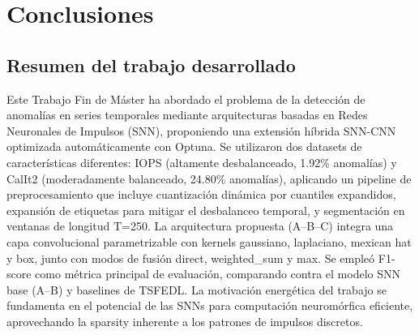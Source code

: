 \chapter{Conclusiones}

\section{Resumen del trabajo desarrollado}
Este Trabajo Fin de Máster ha abordado el problema de la detección de anomalías en series temporales mediante arquitecturas basadas en Redes Neuronales de Impulsos (SNN), proponiendo una extensión híbrida SNN-CNN optimizada automáticamente con Optuna. Se utilizaron dos datasets de características diferentes: IOPS (altamente desbalanceado, 1.92\% anomalías) y CalIt2 (moderadamente balanceado, 24.80\% anomalías), aplicando un pipeline de preprocesamiento que incluye cuantización dinámica por cuantiles expandidos, expansión de etiquetas para mitigar el desbalanceo temporal, y segmentación en ventanas de longitud T=250. La arquitectura propuesta (A--B--C) integra una capa convolucional parametrizable con kernels gaussiano, laplaciano, mexican hat y box, junto con modos de fusión direct, weighted\_sum y max. Se empleó F1-score como métrica principal de evaluación, comparando contra el modelo SNN base (A--B) y baselines de TSFEDL. La motivación energética del trabajo se fundamenta en el potencial de las SNNs para computación neuromórfica eficiente, aprovechando la sparsity inherente a los patrones de impulsos discretos.

